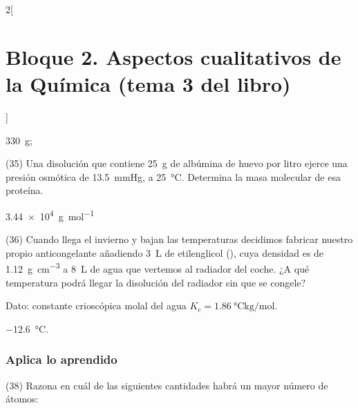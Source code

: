\documentclass[10pt]{article}
\begin{document}
\begin{multicols}{2}[
    \section{Bloque 2. Aspectos cualitativos de la Química (tema 3 del libro)}
  ]
\begin{solution}
  \begin{enumerate*}
    \item \SI{330}{\gram};
    \item {}
  \end{enumerate*}
\end{solution}




\begin{exercise}[
    tags    = {},
    topics  = {química,química básica},
    source  = {FQ 1B MGH 2016, p85, e35},
  ]
  (35) Una disolución que contiene \SI{25}{\gram} de albúmina de
  huevo por litro ejerce una presión osmótica de \SI{13.5}{\mmHg}, a
  \SI{25}{\celsius}. Determina la masa molecular de esa proteína.
\end{exercise}

\begin{solution}
  \SI{3.44e4}{\gram\per\mole}
\end{solution}




\begin{exercise}[
    tags    = {},
    topics  = {química,química básica},
    source  = {FQ 1B MGH 2016, p85, e36},
  ]
  (36) Cuando llega el invierno y bajan las temperaturas decidimos fabricar nuestro propio anticongelante añadiendo \SI{3}{\liter} de etilenglicol (), cuya densidad es de \SI{1.12}{\gram\per\cubic\centi\meter} a \SI{8}{\liter} de agua que vertemos al radiador del coche. ¿A qué temperatura podrá llegar la disolución del radiador sin que se congele?

    Dato: constante crioscópica molal del agua \( K_c = \SI{1.86}{\celsius\kilo\gram\per\mole} \).
\end{exercise}

\begin{solution}
  \SI{-12.6}{\celsius}.
\end{solution}





\subsubsection{Aplica lo aprendido}

\begin{exercise}[
    tags    = {},
    topics  = {química,química básica},
    source  = {FQ 1B MGH 2016, p85, e38},
  ]
  (38) Razona en cuál de las siguientes cantidades habrá un mayor número de átomos:


\end{exercise}
\end{multicols}
\end{document}
